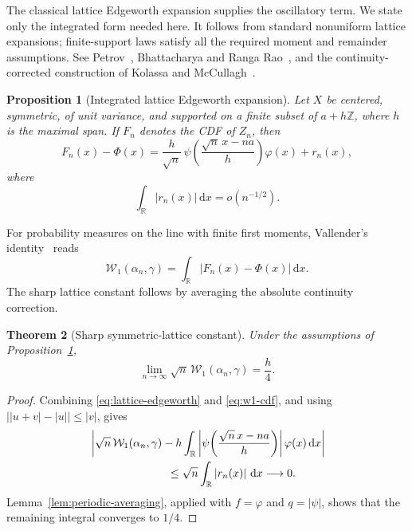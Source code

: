 \documentclass[11pt]{article}
\newtheorem{theorem}{Theorem}[section]
\newtheorem{proposition}[theorem]{Proposition}
\theoremstyle{remark}
\newcommand{\R}{\mathbb{R}}
\newcommand{\Wass}{\mathcal{W}}
\newcommand{\dd}{\,\mathrm{d}}
\newcommand{\abs}[1]{\left\lvert #1\right\rvert}
\begin{document}
The classical lattice Edgeworth expansion supplies the oscillatory term. We
state only the integrated form needed here. It follows from standard
nonuniform lattice expansions; finite-support laws satisfy all the required
moment and remainder assumptions. See Petrov~\cite[Chapter~VII]{Petrov1975},
Bhattacharya and Ranga Rao~\cite[Chapter~5]{BhattacharyaRao2010}, and the
continuity-corrected construction of Kolassa and
McCullagh~\cite{KolassaMcCullagh1990}.

\begin{proposition}[Integrated lattice Edgeworth expansion]
\label{prop:lattice-edgeworth}
Let $X$ be centered, symmetric, of unit variance, and supported on a finite
subset of $a+h\mathbb Z$, where $h$ is the maximal span. If $F_n$ denotes the
CDF of $Z_n$, then
\begin{equation}\label{eq:lattice-edgeworth}
  F_n(x)-\Phi(x)
  =
  \frac{h}{\sqrt n}\,
  \psi\!\left(\frac{\sqrt n\,x-na}{h}\right)\varphi(x)
  +r_n(x),
\end{equation}
where
\begin{equation}\label{eq:lattice-edgeworth-remainder}
  \int_{\R}\abs{r_n(x)}\dd x=o(n^{-1/2}).
\end{equation}
\end{proposition}

For probability measures on the line with finite first moments, Vallender's
identity~\cite{Vallender1974} reads
\begin{equation}\label{eq:w1-cdf}
  \Wass_1(\alpha_n,\gamma)
  =\int_{\R}\abs{F_n(x)-\Phi(x)}\dd x.
\end{equation}
The sharp lattice constant follows by averaging the absolute continuity
correction.

\begin{theorem}[Sharp symmetric-lattice constant]
\label{thm:sharp-lattice-w1}
Under the assumptions of Proposition~\ref{prop:lattice-edgeworth},
\begin{equation}\label{eq:sharp-lattice-w1}
  \lim_{n\to\infty}\sqrt n\,\Wass_1(\alpha_n,\gamma)=\frac h4.
\end{equation}
\end{theorem}

\begin{proof}
Combining \eqref{eq:lattice-edgeworth} and \eqref{eq:w1-cdf}, and using
$\bigl|\abs{u+v}-\abs{u}\bigr|\leq\abs{v}$, gives
\begin{align}
  &\left|
  \sqrt n\,\Wass_1(\alpha_n,\gamma)
  -h\int_{\R}
  \abs{\psi\!\left(\frac{\sqrt n\,x-na}{h}\right)}
  \varphi(x)\dd x
  \right| \notag\\
  &\hspace{7em}\leq
  \sqrt n\int_{\R}\abs{r_n(x)}\dd x
  \longrightarrow0.
  \label{eq:w1-remainder-control}
\end{align}
Lemma~\ref{lem:periodic-averaging}, applied with $f=\varphi$ and
$q=\abs{\psi}$, shows that the remaining integral converges to $1/4$.
\end{proof}
\end{document}

